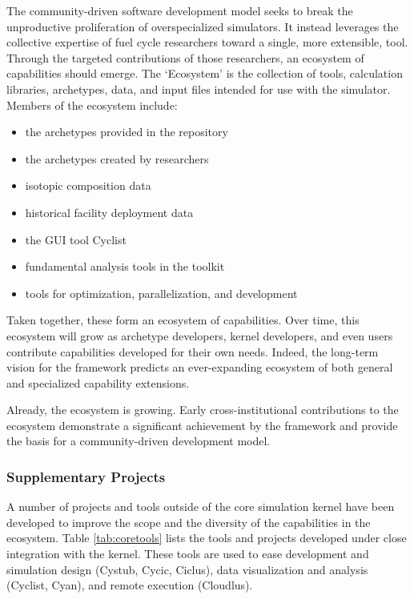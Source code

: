 The \Cyclus community-driven software development model seeks to break the 
unproductive proliferation of overspecialized simulators. It instead leverages 
the collective expertise of fuel cycle researchers toward a single, more 
extensible, tool. Through the targeted
contributions of those researchers, an ecosystem of capabilities should emerge.
The \Cyclus `Ecosystem' is the collection of tools, calculation libraries, 
archetypes, data, and input files intended for use with the \Cyclus simulator. 
Members of the ecosystem include:
\begin{itemize}
\item the archetypes provided in the \Cycamore \cite{carlsen_cycamore_2014} 
repository
\item the archetypes created by researchers
\item isotopic composition data
\item historical facility deployment data
\item the \Cyclus \gls{GUI} tool Cyclist
\item fundamental analysis tools in the \Cyclus toolkit
\item tools for \Cyclus optimization, parallelization, and development
\end{itemize}
Taken together, these form an ecosystem of capabilities. Over time, this 
ecosystem will grow as archetype developers, kernel developers, and 
even users contribute capabilities developed for their own needs. Indeed, the 
long-term vision for the \Cyclus framework predicts an ever-expanding ecosystem 
of both general and specialized capability extensions. 

Already, the ecosystem is growing. Early cross-institutional contributions to 
the ecosystem demonstrate a significant achievement by the \Cyclus framework 
and provide the basis for a community-driven development model. 

\subsubsection{Supplementary Projects}

A number of projects and tools outside of the core simulation kernel have been 
developed to improve the scope and the diversity of the capabilities in the \Cyclus 
ecosystem. Table \ref{tab:coretools} lists the tools and projects developed 
under close integration with the \Cyclus kernel.  These tools are used to ease development
and simulation design (Cystub, Cycic, Ciclus), data visualization and analysis (Cyclist, Cyan),
and remote execution (Cloudlus).

